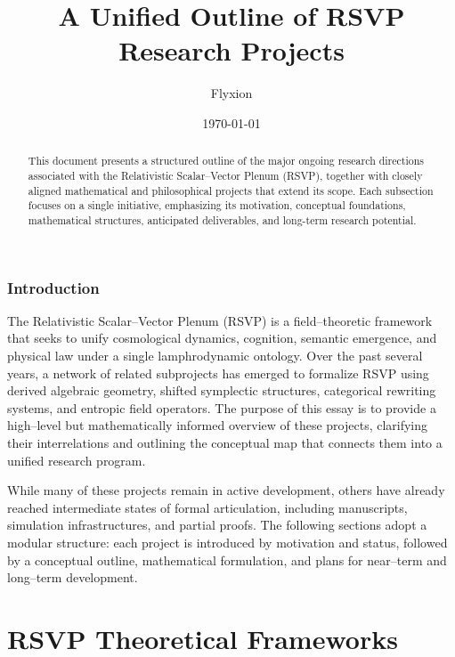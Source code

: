 \documentclass[12pt]{article}
\title{A Unified Outline of RSVP Research Projects}
\author{Flyxion}
\date{\today}
\theoremstyle{plain}
\theoremstyle{definition}
\theoremstyle{remark}
\begin{document}
\maketitle

\begin{abstract}
This document presents a structured outline of the major ongoing research
directions associated with the Relativistic Scalar--Vector Plenum (RSVP), 
together with closely aligned mathematical and philosophical projects that
extend its scope. Each subsection focuses on a single initiative, emphasizing
its motivation, conceptual foundations, mathematical structures, anticipated
deliverables, and long-term research potential. 
\end{abstract}


\section{Introduction}

The Relativistic Scalar--Vector Plenum (RSVP) is a field--theoretic framework
that seeks to unify cosmological dynamics, cognition, semantic emergence, and
physical law under a single lamphrodynamic ontology. Over the past several
years, a network of related subprojects has emerged to formalize RSVP using
derived algebraic geometry, shifted symplectic structures, categorical
rewriting systems, and entropic field operators. The purpose of this essay is
to provide a high--level but mathematically informed overview of these projects,
clarifying their interrelations and outlining the conceptual map that connects
them into a unified research program.

While many of these projects remain in active development, others have already
reached intermediate states of formal articulation, including manuscripts,
simulation infrastructures, and partial proofs. The following sections adopt a
modular structure: each project is introduced by motivation and status, followed
by a conceptual outline, mathematical formulation, and plans for near--term
and long--term development.

\newpage

\part{RSVP Theoretical Frameworks}
\end{document}
